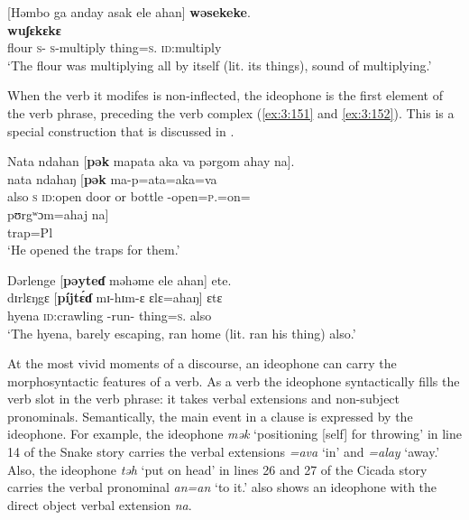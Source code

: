 \ea \label{ex:3:150}
[Həmbo  ga  anday  asak  ele  ahan]  \textbf{wəsekeke}.\\
\gll  [hʊmbɔ  ga  a-ndaj    a-sak    ɛlɛ=ahaŋ]    \textbf{wuʃɛkɛkɛ}\\
      flour  {\ADJ}  \textsc{s}-{\PRG}    \textsc{s}-multiply  thing=\textsc{s}.{\POSS}  \textsc{id}:multiply\\
\glt  ‘The flour was multiplying all by itself (lit. its things), sound of multiplying.’
\z

When the verb it modifes is non-inflected, the ideophone is the first element of the verb phrase, preceding the verb complex (\ref{ex:3:151} and \ref{ex:3:152}).  This is a special construction that is discussed in .

\ea \label{ex:3:151}
Nata  ndahan  [\textbf{pək}  mapata  aka  va  pərgom  ahay  na].\\
\gll nata  ndahaŋ  [\textbf{pək}      ma-p=ata=aka=va  \\
      also    \textsc{s}  {\textsc{id}:open door or bottle} {\NOM}{}-open=\textsc{p}.{\IO}=on={\PRF} \\
      
      \medskip
\gll pʊrgʷɔm=ahaj  na]\\
     trap=Pl  {\PSP}\\
\glt ‘He opened the traps for them.’
\z

\ea \label{ex:3:152}
Dərlenge  [\textbf{pəyteɗ}  məhəme  ele  ahan]  ete.\\
\gll  dɪrlɛŋgɛ  [\textbf{píjt\'{ɛ}ɗ}    mɪ-hɪm-ɛ  ɛlɛ=ahaŋ]    ɛtɛ\\
      hyena  \textsc{id}:crawling  {\NOM}{}-run-{\CL}  thing=\textsc{s}.{\POSS}  also\\
\glt  ‘The hyena, barely escaping, ran home (lit. ran his thing) also.’
\z

At the most vivid moments of a discourse, an ideophone can carry the morphosyntactic features of a verb. As a verb the ideophone syntactically fills the verb slot in the verb phrase: it takes verbal extensions and non-subject pronominals. Semantically, the main event in a clause is expressed by the ideophone. For example, the ideophone \textit{mək} ‘positioning [self] for throwing’ in line 14 of the Snake story  carries the verbal extensions \textit{=ava} ‘in’ and\textit{ =alay} ‘away.’ Also, the ideophone \textit{təh} ‘put on head’ in lines 26 and 27 of the Cicada story  carries the verbal pronominal \textit{an=an} ‘to it.’  also shows an ideophone with the direct object verbal extension \textit{na}.

